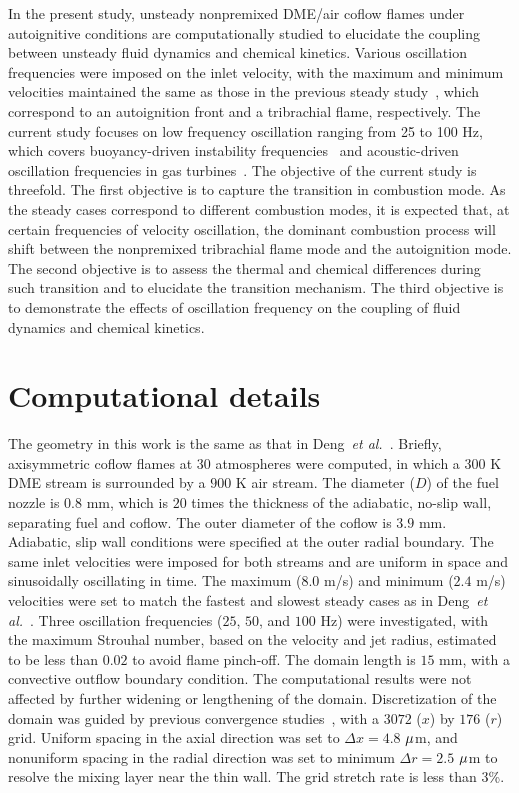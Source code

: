 \documentclass[review,3p,times]{elsarticle}
\begin{document}
In the present study, unsteady nonpremixed DME/air coflow flames under autoignitive conditions are computationally studied to elucidate the coupling between unsteady fluid dynamics and chemical kinetics.  Various oscillation frequencies were imposed on the inlet velocity, with the maximum and minimum velocities maintained the same as those in the previous steady study~\cite{deng15b}, which correspond to an autoignition front and a tribrachial flame, respectively.  \textcolor{Rev1}{The current study focuses on low frequency oscillation ranging from 25 to 100 Hz, which covers buoyancy-driven instability frequencies~\cite{mohammed98,dworkin07} and acoustic-driven oscillation frequencies in gas turbines~\cite{temme12}.}  The objective of the current study is threefold.  The first objective is to capture the transition in combustion mode.  As the steady cases correspond to different combustion modes, it is expected that, at certain frequencies of velocity oscillation, the dominant combustion process will shift between the nonpremixed tribrachial flame mode and the autoignition mode.  The second objective is to assess the thermal and chemical differences during such transition and to elucidate the transition mechanism.  The third objective is to demonstrate the effects of oscillation frequency on the coupling of fluid dynamics and chemical kinetics.               

 

\section{Computational details} \label{sec:computation}

The geometry in this work is the same as that in Deng~\emph{et al.}~\cite{deng15b}.  Briefly, axisymmetric coflow flames at $30$ atmospheres were computed, in which a $300$ K DME stream is surrounded by a $900$ K air stream.  The diameter ($D$) of the fuel nozzle is $0.8$ mm, which is $20$ times the thickness of the adiabatic, no-slip wall, separating fuel and coflow.  The outer diameter of the coflow is $3.9$ mm.  Adiabatic, slip wall conditions were specified at the outer radial boundary.  The same inlet velocities were imposed for both streams and are uniform in space and sinusoidally oscillating in time.  The maximum ($8.0$ m/s) and minimum ($2.4$ m/s) velocities were set to match the fastest and slowest steady cases as in Deng~\emph{et al.}~\cite{deng15b}.  Three oscillation frequencies ($25$, $50$, and $100$ Hz) were investigated, with the maximum Strouhal number, based on the velocity and jet radius, estimated to be less than $0.02$ to avoid flame pinch-off.  The domain length is $15$ mm, with a convective outflow boundary condition.  The computational results were not affected by further widening or lengthening of the domain.  Discretization of the domain was guided by previous convergence studies~\cite{deng15}, with a $3072$ ($x$) by $176$ ($r$) grid.  Uniform spacing in the axial direction was set to $\Delta x = 4.8$ ${\rm \mu}$m, and nonuniform spacing in the radial direction was set to minimum $\Delta r = 2.5$ ${\rm \mu}$m to resolve the mixing layer near the thin wall.  The grid stretch rate is less than $3$\%.
\end{document}
